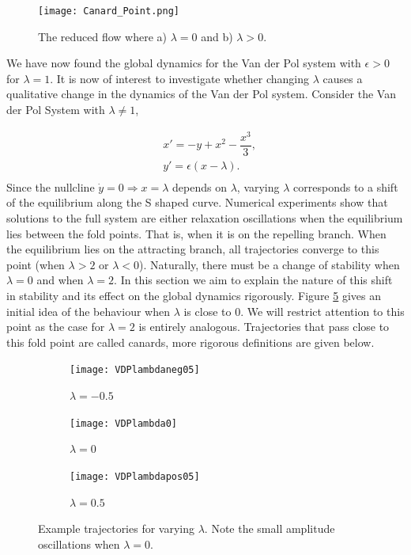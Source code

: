 \begin{figure}[h!]
	\centering
	\texttt{[image: Canard\_Point.png]}
	\caption{The reduced flow where a) $\lambda=0$ and b) $\lambda>0$.}
	\label{fig: Canard Point}
\end{figure}

We have now found the global dynamics for the Van der Pol system with $\epsilon >0$ for $\lambda =1$. It is now of interest to investigate whether changing $\lambda$ causes a qualitative change in the dynamics of the Van der Pol system. Consider the Van der Pol System with $\lambda \neq 1$,

\begin{equation}
\begin{aligned}
&x'=-y+x^2-\dfrac{x^3}{3},\\
&y'=\epsilon(x-\lambda).\\
\end{aligned}
\label{eq: canard system}
\end{equation}
Since the nullcline $\dot{y}=0 \Rightarrow x=\lambda$ depends on $\lambda$, varying $\lambda$ corresponds to a shift of the equilibrium along the S shaped curve. Numerical experiments show that solutions to the full system are either relaxation oscillations when the equilibrium lies between the fold points. That is, when it is on the repelling branch. When the equilibrium lies on the attracting branch, all trajectories converge to this point (when $\lambda>2$ or $\lambda<0$). Naturally, there must be a change of stability when $\lambda=0$ and when $\lambda=2$. In this section we aim to explain the nature of this shift in stability and its effect on the global dynamics rigorously. Figure \ref{fig:varLambda} gives an initial idea of the behaviour when $\lambda$ is close to 0. We will restrict attention to this point as the case for $\lambda=2$ is entirely analogous. Trajectories that pass close to this fold point are called canards, more rigorous definitions are given below.\\
 

\begin{figure}[h!]
	\centering
	\begin{subfigure}[t]{0.33\textwidth}
		\centering
		\texttt{[image: VDPlambdaneg05]}
		\caption{$\lambda=-0.5$}
		\label{}
	\end{subfigure}
	\hfill
		\begin{subfigure}[t]{0.32\textwidth}
		\texttt{[image: VDPlambda0]}
		\caption{$\lambda=0$}
		\label{} 
	\end{subfigure}
\hfill
	\begin{subfigure}[t]{0.33\textwidth}
		\texttt{[image: VDPlambdapos05]}
		\caption{$\lambda=0.5$}
		\label{} 
	\end{subfigure}
	\caption[Example trajectories for varying $\lambda$]{Example trajectories for varying $\lambda$. Note the small amplitude oscillations when $\lambda=0$. }
	\label{fig:varLambda}
\end{figure}

